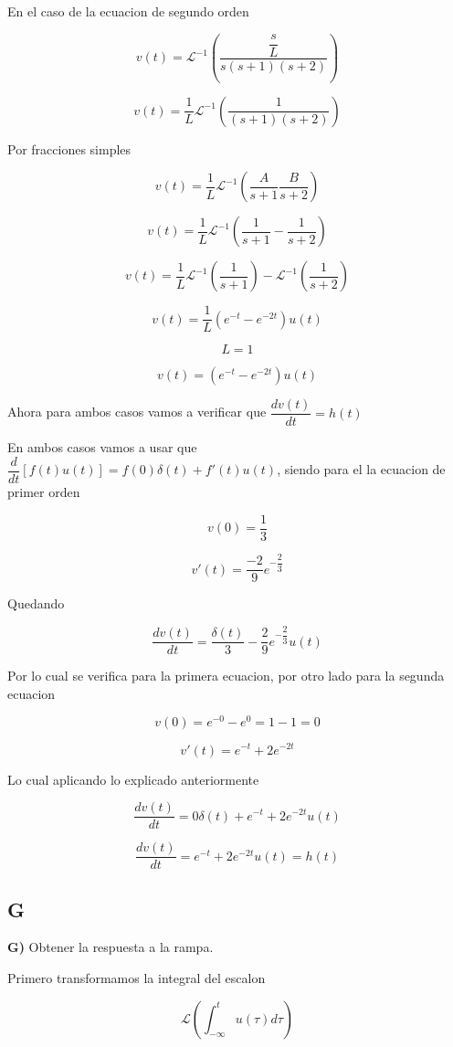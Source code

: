 En el caso de la ecuacion de segundo orden

$$v(t) = \mathscr{L}^{-1} (\dfrac{\dfrac{s}{L}}{s (s + 1) (s + 2)})$$

$$v(t) = \dfrac{1}{L} \mathscr{L}^{-1} (\dfrac{1}{(s + 1)(s + 2)})$$

Por fracciones simples

$$v(t) = \dfrac{1}{L} \mathscr{L}^{-1} (\dfrac{A}{s + 1} \dfrac{B}{s + 2})$$

$$v(t) = \dfrac{1}{L} \mathscr{L}^{-1} (\dfrac{1}{s + 1} - \dfrac{1}{s + 2})$$

$$v(t) = \dfrac{1}{L} \mathscr{L}^{-1} (\dfrac{1}{s + 1}) - \mathscr{L}^{-1} (\dfrac{1}{s + 2})$$

$$v(t) = \dfrac{1}{L} (e^{-t} - e^{-2t}) u(t) $$

$$L=1$$

$$v(t) = (e^{-t} - e ^{-2t}) u(t)$$

Ahora para ambos casos vamos a verificar que $\dfrac{dv(t)}{dt} = h(t)$

En ambos casos vamos a usar que $\dfrac{d}{dt} [f(t)u(t)] = f(0)\delta (t) + f'(t) u(t)$, siendo para el la ecuacion de primer orden

$$v(0) = \dfrac{1}{3} $$

$$v'(t) = \dfrac{-2}{9} e^{-\dfrac{2}{3}}$$

Quedando

$$\dfrac{dv(t)}{dt} = \dfrac{\delta(t)}{3} - \dfrac{2}{9} e^{-\dfrac{2}{3}} u(t) $$

Por lo cual se verifica para la primera ecuacion, por otro lado para la segunda ecuacion

$$v(0) = e^{-0} - e^{0} = 1 - 1 = 0$$

$$v'(t) = e^{-t} + 2e^{-2t} $$

Lo cual aplicando lo explicado anteriormente

$$\dfrac{dv(t)}{dt} = 0 \delta(t) + e^{-t} + 2e^{-2t} u(t) $$

$$\dfrac{dv(t)}{dt} = e^{-t} + 2e^{-2t} u(t) = h(t)$$

\subsection{G}

\textbf{G)} Obtener la respuesta a la rampa.

Primero transformamos la integral del escalon

$$\mathscr{L} (\int_{-\infty}^{t} u(\tau) d\tau)$$

